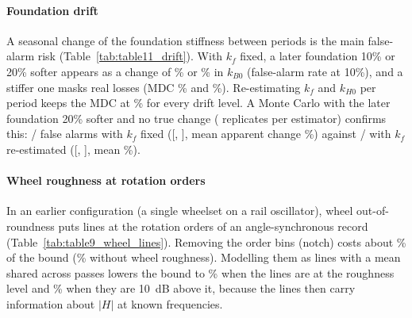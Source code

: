 \paragraph{Foundation drift}\label{sec:res-drift}
A seasonal change of the foundation stiffness between periods is the main false-alarm risk
(Table~\ref{tab:table11_drift}). With $k_f$ fixed, a later foundation 10\% or 20\% softer appears as a
change of \DriftSoftTenApparent\% or \DriftSoftTwentyApparent\% in $k_{B0}$ (false-alarm rate
\DriftSoftTenFA{} at 10\%), and a stiffer one masks real losses (MDC \DriftStiffTenMDC\% and
\DriftStiffTwentyMDC\%). Re-estimating $k_f$ and $k_{H0}$ per period keeps the MDC at \DriftCoestMDC\%
for every drift level. A Monte Carlo with the later foundation 20\% softer and no true change
(\DriftMCNomN{} replicates per estimator) confirms this: \DriftMCNomFA/\DriftMCNomN{} false alarms with
$k_f$ fixed ([\DriftMCNomLo, \DriftMCNomHi], mean apparent change \DriftMCNomMean\%) against
\DriftMCCoestFA/\DriftMCCoestN{} with $k_f$ re-estimated ([\DriftMCCoestLo, \DriftMCCoestHi], mean
\DriftMCCoestMean\%).


\paragraph{Wheel roughness at rotation orders}\label{sec:res-wheel}
In an earlier configuration (a single wheelset on a rail oscillator), wheel out-of-roundness puts lines at the rotation orders of an angle-synchronous record
(Table~\ref{tab:table9_wheel_lines}). Removing the order bins (notch) costs about \WLNotchCost\% of the
bound (\WLNone\% without wheel roughness). Modelling them as lines with a mean shared across passes
lowers the bound to \WLTachoZero\% when the lines are at the roughness level and \WLTachoTen\% when
they are 10~dB above it, because the lines then carry information about $|H|$ at known frequencies.


